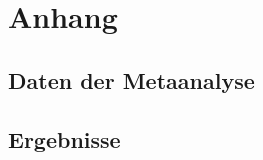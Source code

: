 \appendix

\section{Anhang}

\subsection{Daten der Metaanalyse}









\subsection{Ergebnisse}



